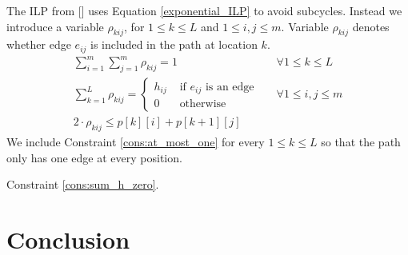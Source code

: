 \documentclass[sigconf,natbib=false]{acmart}
\begin{document}
The ILP from [] uses Equation \ref{exponential_ILP} to avoid subcycles. Instead we introduce a variable $\rho_{kij}$, for $1 \leq k \leq L$ and $1 \leq i, j \leq m$. Variable $\rho_{kij}$ denotes whether edge $e_{ij}$ is included in the path at location $k$.
\begin{align}
  \sum_{i=1}^m \sum_{j=1}^m \rho_{kij} = 1 &&\forall 1 \leq k \leq L \label{cons:at_most_one}\\
  \sum_{k=1}^L \rho_{kij} = \begin{cases} h_{ij} &\text{ if } e_{ij} \text{ is an edge} \\
    0 &\text{ otherwise}
  \end{cases} && \forall 1 \leq i, j \leq m \label{cons:sum_h_zero}\\
  2 \cdot \rho_{kij} \leq p[k][i] + p[k+1][j]
\end{align}
We include Constraint \ref{cons:at_most_one} for every $1 \leq k \leq L$ so that the path only has one edge at every position.

Constraint \ref{cons:sum_h_zero}.

\section{Conclusion}



\end{document}
